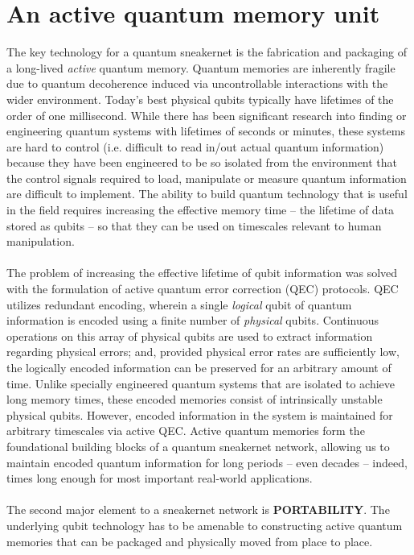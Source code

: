 \documentclass[aps,prl,twocolumn,10pt,nofootinbib]{revtex4}
\begin{document}
\section{An active quantum memory unit}
The key technology for a quantum sneakernet is the fabrication and packaging of a long-lived {\em active} quantum memory.  Quantum memories are inherently fragile due to quantum decoherence induced via uncontrollable interactions with the wider environment.  Today's best physical qubits typically have lifetimes of the order of one millisecond. While there has been significant research into finding or engineering quantum systems with lifetimes of seconds or minutes, these systems are hard to control (i.e. difficult to read in/out actual quantum information) because they have been engineered to be so isolated from the environment that the control signals required to load, manipulate or measure quantum information are difficult to implement.  The ability to build quantum technology that is useful in the field requires increasing the effective memory time -- the lifetime of data stored as qubits -- so that they can be used on timescales relevant to human manipulation.  
\\
\\
The problem of increasing the effective lifetime of qubit information was solved with the formulation of active quantum error correction (QEC) protocols.  QEC utilizes redundant encoding, wherein a single {\em logical} qubit of quantum information is encoded using a finite number of {\em physical} qubits.  Continuous operations on this array of physical qubits are used to extract information regarding physical errors; and, provided physical error rates are sufficiently low, the logically encoded information can be preserved for an arbitrary amount of time.  Unlike specially engineered quantum systems that are isolated to achieve long memory times, these encoded memories consist of intrinsically unstable physical qubits.  However, encoded information in the system is maintained for arbitrary timescales via active QEC.  Active quantum memories form the foundational building blocks of a quantum sneakernet network, allowing us to maintain encoded quantum information for long periods -- even decades -- indeed, times long enough for most important real-world applications.  
\\
\\
The second major element to a sneakernet network is {\bf PORTABILITY}.  The underlying qubit technology has to be amenable to constructing active quantum memories that can be packaged and physically moved from place to place.  
\end{document}
